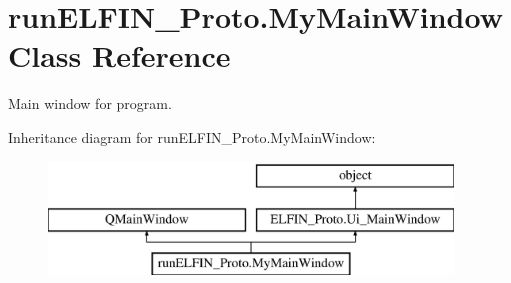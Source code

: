 \hypertarget{classrunELFIN__Proto_1_1MyMainWindow}{\section{run\-E\-L\-F\-I\-N\-\_\-\-Proto.\-My\-Main\-Window Class Reference}
\label{classrunELFIN__Proto_1_1MyMainWindow}
}


Main window for program.  


Inheritance diagram for run\-E\-L\-F\-I\-N\-\_\-\-Proto.\-My\-Main\-Window\-:\begin{figure}[H]
\begin{center}
\leavevmode
\includegraphics[height=3.000000cm]{classrunELFIN__Proto_1_1MyMainWindow}
\end{center}
\end{figure}
